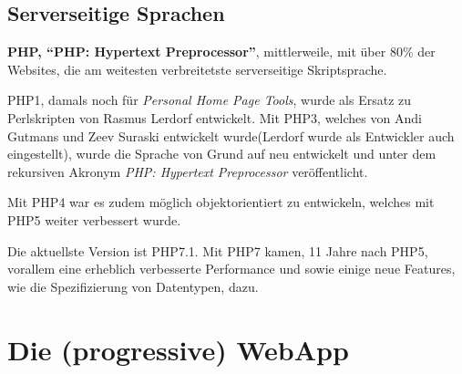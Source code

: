 \documentclass[a4paper,12pt,ngerman,listof=numbered]{scrartcl}      %
\let\oldcite\cite
\renewcommand{\cite}[1]{\textsuperscript{\oldcite{#1}}}
\newcommand{\spacer}{\par\bigskip\noindent}
\begin{document}
	\subsection{Serverseitige Sprachen}
	
	\spacer\textbf{PHP, ``PHP: Hypertext Preprocessor''}, mittlerweile, mit über 80\% der Websites, die am weitesten verbreitetste serverseitige Skriptsprache.\cite{phpCoverage}\par
	PHP1, damals noch für \emph{Personal Home Page Tools}, wurde als Ersatz zu Perlskripten von Rasmus Lerdorf entwickelt. Mit PHP3, welches von Andi Gutmans und Zeev Suraski entwickelt wurde(Lerdorf wurde als Entwickler auch eingestellt), wurde die Sprache von Grund auf neu entwickelt und unter dem rekursiven Akronym \emph{PHP: Hypertext Preprocessor} veröffentlicht.\par
	Mit PHP4 war es zudem möglich objektorientiert zu entwickeln, welches mit PHP5 weiter verbessert wurde.\par
	Die aktuellste Version ist PHP7.1. Mit PHP7 kamen, 11 Jahre nach PHP5, vorallem eine erheblich verbesserte Performance und sowie einige neue Features, wie die Spezifizierung von Datentypen, dazu.\cite{phpWiki}\par
	
	\section{Die (progressive) WebApp}
\end{document}
